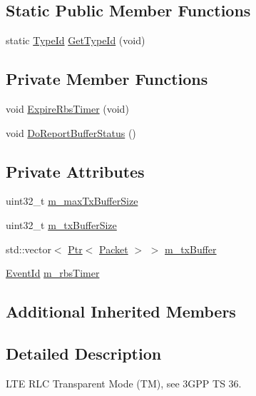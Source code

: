 \subsection*{Static Public Member Functions}
\begin{DoxyCompactItemize}
\item 
static \hyperlink{classns3_1_1TypeId}{Type\+Id} \hyperlink{classns3_1_1LteRlcTm_a3c5559ed33e69240e5c42f0178f45224}{Get\+Type\+Id} (void)
\end{DoxyCompactItemize}
\subsection*{Private Member Functions}
\begin{DoxyCompactItemize}
\item 
void \hyperlink{classns3_1_1LteRlcTm_a7024f02eff50e3804b07027f0826a784}{Expire\+Rbs\+Timer} (void)
\item 
void \hyperlink{classns3_1_1LteRlcTm_a21829b93685d3aded5e5d298e28cde91}{Do\+Report\+Buffer\+Status} ()
\end{DoxyCompactItemize}
\subsection*{Private Attributes}
\begin{DoxyCompactItemize}
\item 
uint32\+\_\+t \hyperlink{classns3_1_1LteRlcTm_abf75ac152a0470e0f66d13a1d864a147}{m\+\_\+max\+Tx\+Buffer\+Size}
\item 
uint32\+\_\+t \hyperlink{classns3_1_1LteRlcTm_a8be5f1fa70a1c3f6f13450a46e2d34a3}{m\+\_\+tx\+Buffer\+Size}
\item 
std\+::vector$<$ \hyperlink{classns3_1_1Ptr}{Ptr}$<$ \hyperlink{classns3_1_1Packet}{Packet} $>$ $>$ \hyperlink{classns3_1_1LteRlcTm_a01ff97b4fb7201dd3feeab5a07703cbf}{m\+\_\+tx\+Buffer}
\item 
\hyperlink{classns3_1_1EventId}{Event\+Id} \hyperlink{classns3_1_1LteRlcTm_a8d10d7af1d0897e6bc82d892d8b87749}{m\+\_\+rbs\+Timer}
\end{DoxyCompactItemize}
\subsection*{Additional Inherited Members}


\subsection{Detailed Description}
L\+TE R\+LC Transparent Mode (TM), see 3\+G\+PP TS 36. 


